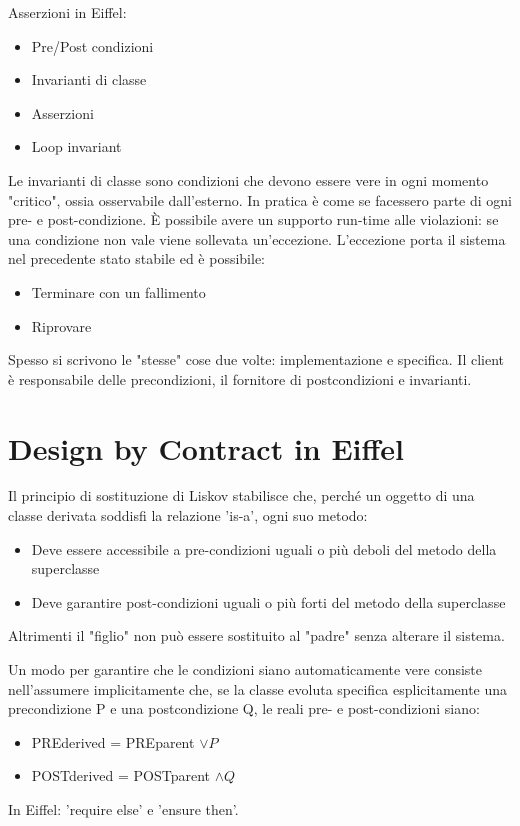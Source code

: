 \documentclass[a4paper,12pt,titlepage,oneside]{book}
\begin{document}
    Asserzioni in Eiffel:
\begin{itemize}
    \item Pre/Post condizioni
    \item Invarianti di classe
    \item Asserzioni
    \item Loop invariant
\end{itemize}
    Le invarianti di classe sono condizioni che devono essere vere in ogni momento "critico", ossia osservabile dall’esterno. In pratica è come se facessero parte di ogni pre- e post-condizione.
    È possibile avere un supporto run-time alle violazioni: se una condizione non vale viene sollevata un'eccezione. L'eccezione porta il sistema nel precedente stato stabile ed è possibile:
\begin{itemize}
    \item Terminare con un fallimento
    \item Riprovare
\end{itemize}
    Spesso si scrivono le "stesse" cose due volte: implementazione e specifica.
    Il client è responsabile delle precondizioni, il fornitore di postcondizioni e invarianti.

\section{Design by Contract in Eiffel}
    Il principio di sostituzione di Liskov stabilisce che, perché un oggetto di una classe derivata soddisfi la relazione 'is-a', ogni suo metodo:
\begin{itemize}
    \item Deve essere accessibile a pre-condizioni uguali o più deboli del metodo della superclasse
    \item Deve garantire post-condizioni uguali o più forti del metodo della superclasse 
\end{itemize}
    Altrimenti il "figlio" non può essere sostituito al "padre" senza alterare il sistema.

    Un modo per garantire che le condizioni siano automaticamente vere consiste nell'assumere implicitamente che, se la classe evoluta specifica esplicitamente una precondizione P e una postcondizione Q, 
    le reali pre- e post-condizioni siano:
\begin{itemize}
    \item PREderived = PREparent $\vee P$
    \item POSTderived = POSTparent $\wedge Q$
\end{itemize}
    In Eiffel: 'require else' e 'ensure then'.
\end{document}
